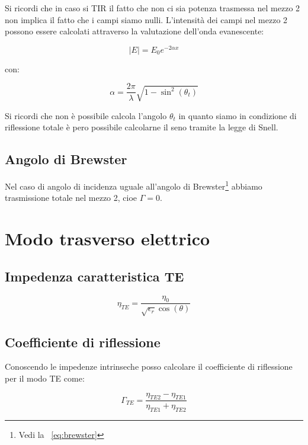 \documentclass[10pt,a4paper]{report}
\begin{document}
			Si ricordi che in caso si TIR il fatto che non ci sia potenza trasmessa nel mezzo 2 non implica il fatto che i campi siamo nulli.
			L'intensità dei campi nel mezzo 2 possono essere calcolati attraverso la valutazione dell'onda evanescente:


		\begin{equation}
		|E|=E_0 e^{-2 \alpha x}
		\end{equation}

		con:

		\begin{equation}
		\alpha= \frac{2 \pi}{\lambda}\sqrt{1-\sin^2(\theta_t)}
		\end{equation}
		
		Si ricordi che non è possibile calcola l'angolo $\theta_t$ in quanto siamo in condizione di riflessione totale è pero possibile calcolarne il seno tramite la legge di Snell.


		\subsection{Angolo di Brewster}

			Nel caso di angolo di incidenza uguale all'angolo di Brewster\footnote{Vedi la ~\ref{eq:brewster}} abbiamo trasmissione totale nel mezzo 2, cioe $\Gamma=0$.

	\section{Modo trasverso elettrico}

		\subsection{Impedenza caratteristica TE}
			\begin{equation}
			\eta_{TE}=\frac{\eta_0}{\sqrt{\epsilon_r}\cos(\theta)}
			\end{equation}

		\subsection{Coefficiente di riflessione}
			Conoscendo le impedenze intrinseche posso calcolare il coefficiente di riflessione per il modo TE come:

			\begin{equation}
			\Gamma_{TE}=\frac{\eta_{TE2}-\eta_{TE1}}{\eta_{TE1}+\eta_{TE2}}
			\end{equation}
\end{document}
